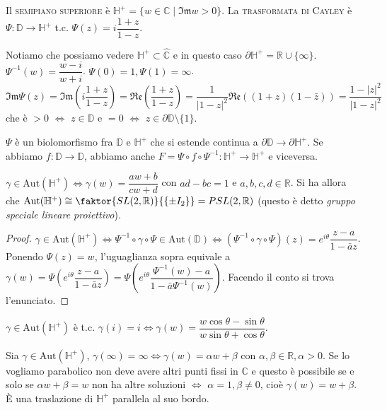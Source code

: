 \begin{defn}
  Il \textsc{semipiano superiore} è $\mathbb{H}^+=\{w \in \mathbb{C} \mid \mathfrak{Im}w>0\}$. La \textsc{trasformata di Cayley} è $\Psi:\mathbb{D} \longrightarrow \mathbb{H}^+$ t.c. $\Psi(z)=i\dfrac{1+z}{1-z}$.
\end{defn}

Notiamo che possiamo vedere $\mathbb{H}^+ \subset \hat{\mathbb{C}}$ e in questo caso $\partial\mathbb{H}^+=\mathbb{R}\cup\{\infty\}$. $\Psi^{-1}(w)=\dfrac{w-i}{w+i}$. $\Psi(0)=1, \Psi(1)=\infty$. \\
$\mathfrak{Im}\Psi(z)=\mathfrak{Im}\left(i\dfrac{1+z}{1-z}\right)=\mathfrak{Re}\left(\dfrac{1+z}{1-z}\right)=\dfrac{1}{|1-z|^2}\mathfrak{Re}((1+z)(1-\bar{z}))=\dfrac{1-|z|^2}{|1-z|^2}$ che è $>0$ $\iff$ $z \in \mathbb{D}$ e $=0$ $\iff$ $z \in \partial\mathbb{D}\setminus\{1\}$.

$\Psi$ è un biolomorfismo fra $\mathbb{D}$ e $\mathbb{H}^+$ che si estende continua a $\partial\mathbb{D} \longrightarrow \partial\mathbb{H}^+$. Se abbiamo $f: \mathbb{D} \longrightarrow \mathbb{D}$, abbiamo anche $F=\Psi \circ f \circ \Psi^{-1}:\mathbb{H}^+ \longrightarrow \mathbb{H}^+$ e viceversa.

\begin{cor}
  $\gamma \in \text{Aut}(\mathbb{H}^+) \iff \gamma(w)=\dfrac{aw+b}{cw+d}$ con $ad-bc=1$ e $a, b, c, d \in \mathbb{R}$. Si ha allora che $\text{Aut}(\mathbb{H}^+) \cong \faktor{SL(2, \mathbb{R})}{\{\pm I_2\}}=PSL(2, \mathbb{R})$ (questo è detto \textit{gruppo speciale lineare proiettivo}).
\end{cor}

\begin{proof}
  $\gamma \in \text{Aut}(\mathbb{H}^+) \iff \Psi^{-1} \circ \gamma \circ \Psi \in \text{Aut}(\mathbb{D}) \iff (\Psi^{-1} \circ \gamma \circ \Psi)(z)=e^{i\theta}\dfrac{z-a}{1-\bar{a}z}$.
  Ponendo $\Psi(z)=w$, l'uguaglianza sopra equivale a $\gamma(w)=\Psi\left(e^{i\theta}\dfrac{z-a}{1-\bar{a}z}\right)=\Psi\left(e^{i\theta}\dfrac{\Psi^{-1}(w)-a}{1-\bar{a}\Psi^{-1}(w)}\right)$. Facendo il conto si trova l'enunciato.
\end{proof}

\begin{exc}
  $\gamma \in \text{Aut}(\mathbb{H}^+)$ è t.c. $\gamma(i)=i \iff \gamma(w)=\dfrac{w\cos{\theta}-\sin{\theta}}{w\sin{\theta}+\cos{\theta}}$.
\end{exc}

\begin{ex}
  Sia $\gamma \in \text{Aut}(\mathbb{H}^+)$, $\gamma(\infty)=\infty \iff \gamma(w)=\alpha w+\beta$ con $\alpha, \beta \in \mathbb{R}, \alpha>0$.
  Se lo vogliamo parabolico non deve avere altri punti fissi in $\mathbb{C}$ e questo è possibile se e solo se $\alpha w+\beta=w$ non ha altre soluzioni $\iff$ $\alpha=1, \beta \not=0$, cioè $\gamma(w)=w+\beta$.
  È una traslazione di $\mathbb{H}^+$ parallela al suo bordo.
\end{ex}

